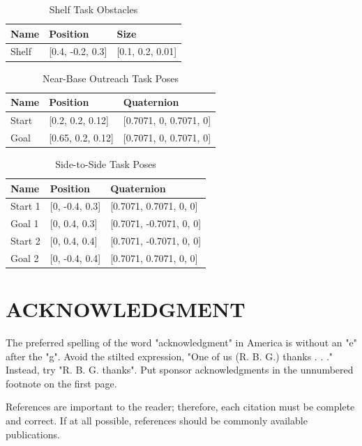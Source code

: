 \documentclass[defaultstyle,11pt]{thesis}
\begin{document}
\begin{table}[H]
    \centering
    \caption{Shelf Task Obstacles}
    \label{tab:simpleShelfObstacles}
    \begin{tabular}{lll}
    \hline
    \textbf{Name} & \textbf{Position} & \textbf{Size} \\
    \hline
    Shelf & [0.4, -0.2, 0.3] & [0.1, 0.2, 0.01] \\
    \hline
    \end{tabular}
\end{table}

\begin{table}[H]
    \centering
    \caption{Near-Base Outreach Task Poses}
    \label{tab:outreachPoses}
    \begin{tabular}{lll}
    \hline
    \textbf{Name} & \textbf{Position} & \textbf{Quaternion} \\
    \hline
    Start & [0.2, 0.2, 0.12] & [0.7071, 0, 0.7071, 0] \\
    Goal & [0.65, 0.2, 0.12] & [0.7071, 0, 0.7071, 0] \\
    \hline
    \end{tabular}
\end{table}

\begin{table}[H]
    \centering
    \caption{Side-to-Side Task Poses}
    \label{tab:sideToSidePoses}
    \begin{tabular}{lll}
    \hline
    \textbf{Name} & \textbf{Position} & \textbf{Quaternion} \\
    \hline
    Start 1 & [0, -0.4, 0.3] & [0.7071, 0.7071, 0, 0] \\
    Goal 1 & [0, 0.4, 0.3] & [0.7071, -0.7071, 0, 0] \\
    Start 2 & [0, 0.4, 0.4] & [0.7071, -0.7071, 0, 0] \\
    Goal 2 & [0, -0.4, 0.4] & [0.7071, 0.7071, 0, 0] \\
    \hline
    \end{tabular}
\end{table}

\section*{ACKNOWLEDGMENT}

The preferred spelling of the word "acknowledgment" in America is without an "e" after the "g". Avoid the stilted expression, "One of us (R. B. G.) thanks . . ."  Instead, try "R. B. G. thanks". Put sponsor acknowledgments in the unnumbered footnote on the first page.




References are important to the reader; therefore, each citation must be complete and correct. If at all possible, references should be commonly available publications.





\end{document}
